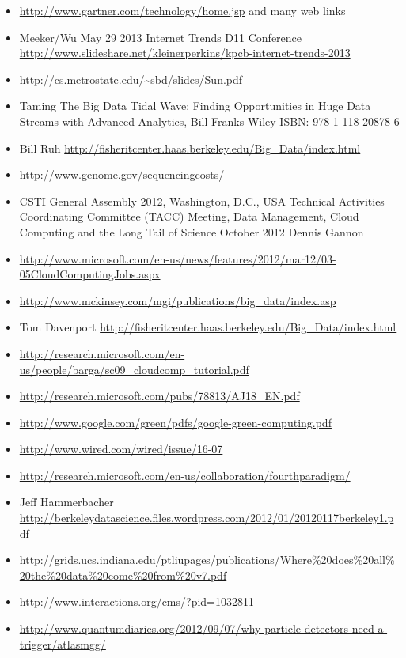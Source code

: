 \begin{itemize}
\item
  \url{http://www.gartner.com/technology/home.jsp} and many web links
\item
  Meeker/Wu May 29 2013 Internet Trends D11 Conference
  \url{http://www.slideshare.net/kleinerperkins/kpcb-internet-trends-2013}
\item
  \url{http://cs.metrostate.edu/~sbd/slides/Sun.pdf}
\item
  Taming The Big Data Tidal Wave: Finding Opportunities in Huge Data
  Streams with Advanced Analytics, Bill Franks Wiley ISBN:
  978-1-118-20878-6
\item
  Bill Ruh
  \url{http://fisheritcenter.haas.berkeley.edu/Big_Data/index.html}
\item
  \url{http://www.genome.gov/sequencingcosts/}
\item
  CSTI General Assembly 2012, Washington, D.C., USA Technical Activities
  Coordinating Committee (TACC) Meeting, Data Management, Cloud
  Computing and the Long Tail of Science October 2012 Dennis Gannon
\item
  \url{http://www.microsoft.com/en-us/news/features/2012/mar12/03-05CloudComputingJobs.aspx}
\item
  \url{http://www.mckinsey.com/mgi/publications/big_data/index.asp}
\item
  Tom Davenport
  \url{http://fisheritcenter.haas.berkeley.edu/Big_Data/index.html}
\item
  \url{http://research.microsoft.com/en-us/people/barga/sc09_cloudcomp_tutorial.pdf}
\item
  \url{http://research.microsoft.com/pubs/78813/AJ18_EN.pdf}
\item
  \url{http://www.google.com/green/pdfs/google-green-computing.pdf}
\item
  \url{http://www.wired.com/wired/issue/16-07}
\item
  \url{http://research.microsoft.com/en-us/collaboration/fourthparadigm/}
\item
  Jeff Hammerbacher
  \url{http://berkeleydatascience.files.wordpress.com/2012/01/20120117berkeley1.pdf}
\item
  \url{http://grids.ucs.indiana.edu/ptliupages/publications/Where\%20does\%20all\%20the\%20data\%20come\%20from\%20v7.pdf}
\item
  \url{http://www.interactions.org/cms/?pid=1032811}
\item
  \url{http://www.quantumdiaries.org/2012/09/07/why-particle-detectors-need-a-trigger/atlasmgg/}

\end{itemize}
